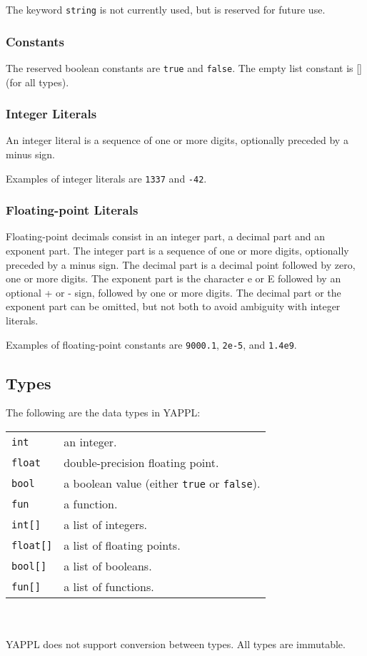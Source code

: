 The keyword \texttt{string}  is not currently used, but is reserved for future use.

\subsubsection{Constants}

The reserved boolean constants are \texttt{true} and \texttt{false}. The empty list constant is [] (for all types). 

\subsubsection{Integer Literals}

An integer literal is a sequence of one or more digits, optionally preceded by a minus sign.

Examples of integer literals are \texttt{1337} and \texttt{-42}. 

\subsubsection{Floating-point Literals}

Floating-point decimals consist in an integer part, a decimal part and an exponent part. The integer part is a sequence of one or more digits, optionally preceded by a minus sign. The decimal part is a decimal point followed by zero, one or more digits. The exponent part is the character e or E followed by an optional + or - sign, followed by one or more digits. The decimal part or the exponent part can be omitted, but not both to avoid ambiguity with integer literals. 

Examples of floating-point constants are \texttt{9000.1}, \texttt{2e-5}, and \texttt{1.4e9}.


\subsection{Types}

The following are the data types in YAPPL:\\
\begin{tabular}{l l}
\texttt{int} & an integer.\\
\texttt{float} & double-precision floating point.\\
\texttt{bool} & a boolean value (either \texttt{true} or \texttt{false}).\\
\texttt{fun} & a function.\\
\texttt{int[]} & a list of integers.\\
\texttt{float[]} & a list of floating points.\\
\texttt{bool[]} & a list of booleans. \\
\texttt{fun[]} & a list of functions.
\end{tabular}\\\\
YAPPL does not support conversion between types. All types are immutable.

